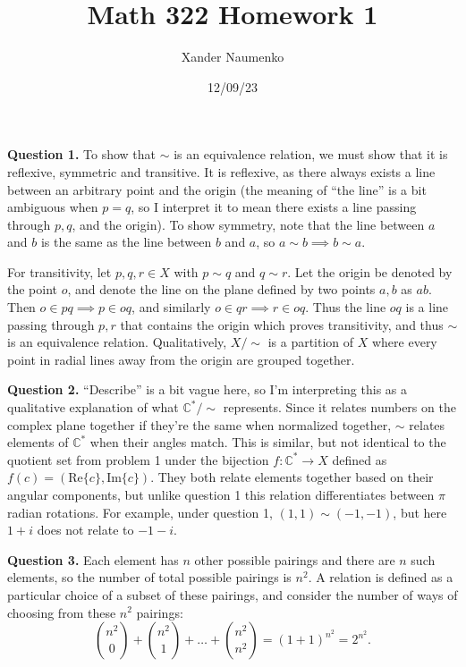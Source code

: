 \documentclass[letterpaper, reqno,11pt]{article}
\begin{document}
\title{Math 322 Homework 1}
\date{12/09/23}
\author{Xander Naumenko}
\maketitle

{\medskip\noindent\bf Question 1.} To show that $\sim$ is an equivalence relation, we must show that it is reflexive, symmetric and transitive. It is reflexive, as there always exists a line between an arbitrary point and the origin (the meaning of ``the line'' is a bit ambiguous when $p=q$, so I interpret it to mean there exists a line passing through $p,q$, and the origin). To show symmetry, note that the line between $a$ and $b$ is the same as the line between $b$ and $a$, so $a\sim b\implies b\sim a$. 

For transitivity, let $p,q,r\in X$ with $p\sim q$ and $q\sim r$. Let the origin be denoted by the point $o$, and denote the line on the plane defined by two points $a, b$ as $ab$. Then $o\in pq\implies p\in oq$, and similarly $o\in qr\implies r\in oq$. Thus the line $oq$ is a line passing through $p,r$ that contains the origin which proves transitivity, and thus $\sim$ is an equivalence relation. Qualitatively, $X /\sim$ is a partition of $X$ where every point in radial lines away from the origin are grouped together.

{\medskip\noindent\bf Question 2.} ``Describe'' is a bit vague here, so I'm interpreting this as a qualitative explanation of what $\mathbb{C}^{*} /\sim$ represents. Since it relates numbers on the complex plane together if they're the same when normalized together, $\sim$ relates elements of $\mathbb{C}^{*}$ when their angles match. This is similar, but not identical to the quotient set from problem 1 under the bijection $f:\mathbb{C}^{*}\to X$ defined as $f(c)=\left( \text{Re}\{c\}, \text{Im}\{c\} \right) $. They both relate elements together based on their angular components, but unlike question 1 this relation differentiates between $\pi$ radian rotations. For example, under question 1, $(1, 1)\sim(-1, -1)$, but here $1+i$ does not relate to $-1-i$.

{\medskip\noindent\bf Question 3.} Each element has $n$ other possible pairings and there are $n$ such elements, so the number of total possible pairings is $n^2$. A relation is defined as a particular choice of a subset of these pairings, and consider the number of ways of choosing from these $n^2$ pairings:
\[
    {n^2\choose 0}+{n^2\choose 1}+\ldots +{n^2\choose n^2}=(1+1)^{n^2}=2^{n^2}
.\]
\end{document}
